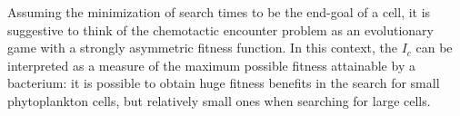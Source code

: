 \documentclass[9pt,twocolumn,twoside]{pnas-new}
\providecommand{\DIFdelbegin}{} %
\providecommand{\DIFdelend}{} %
\begin{document}
\DIFdelbegin %


\DIFdelend %
Assuming the minimization of search times to be the end-goal of a cell, it is suggestive to think of the chemotactic encounter problem as an evolutionary game with a strongly asymmetric fitness function.
In this context, the $I_c$ can be interpreted as a measure of the maximum possible fitness attainable by a bacterium: it is possible to obtain huge fitness benefits in the search for small phytoplankton cells, but relatively small ones when searching for large cells. 
\end{document}

